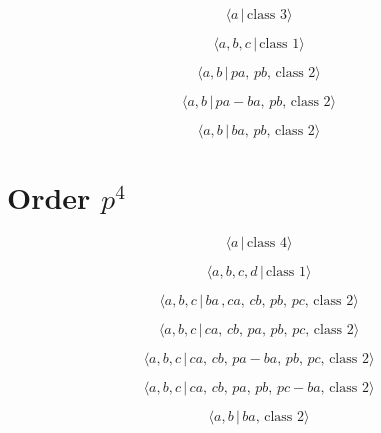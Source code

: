 \documentclass[10pt]{article}
\begin{document}
\begin{equation}
\langle a\,|\,\text{class }3\rangle  \tag{3.0}
\end{equation}

\begin{equation}
\langle a,b,c\,|\,\text{class }1\rangle  \tag{3.1}
\end{equation}

\begin{equation}
\langle a,b\,|\,pa,\,pb,\,\text{class }2\rangle  \tag{3.2}
\end{equation}

\begin{equation}
\langle a,b\,|\,pa-ba,\,pb,\,\text{class }2\rangle  \tag{3.3}
\end{equation}

\begin{equation}
\langle a,b\,|\,ba,\,pb,\,\text{class }2\rangle  \tag{3.4}
\end{equation}

\section{Order $p^{4}$}

\begin{equation}
\langle a\,|\,\text{class }4\rangle  \tag{4.0}
\end{equation}

\begin{equation}
\langle a,b,c,d\,|\,\text{class }1\rangle  \tag{4.1}
\end{equation}

\begin{equation}
\langle a,b,c\,|\,ba\,,ca,\,cb,\,pb,\,pc,\,\text{class }2\rangle  \tag{4.2}
\end{equation}

\begin{equation}
\langle a,b,c\,|\,ca,\,cb,\,pa,\,pb,\,pc,\,\text{class }2\rangle  \tag{4.3}
\end{equation}

\begin{equation}
\langle a,b,c\,|\,ca,\,cb,\,pa-ba,\,pb,\,pc,\,\text{class }2\rangle 
\tag{4.4}
\end{equation}

\begin{equation}
\langle a,b,c\,|\,ca,\,cb,\,pa,\,pb,\,pc-ba,\,\text{class }2\rangle 
\tag{4.5}
\end{equation}

\begin{equation}
\langle a,b\,|\,ba,\,\text{class }2\rangle  \tag{4.6}
\end{equation}
\end{document}
